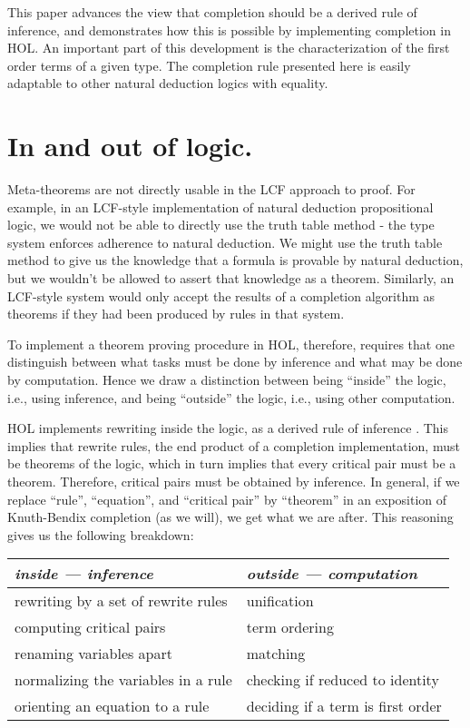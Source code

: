 This paper advances the view that completion should be a derived rule of
inference, and demonstrates how this is possible by implementing completion in
HOL. An important part of this development is the characterization of the first
order terms of a given type. The completion rule presented here is easily
adaptable to other natural deduction logics with equality.

\section{In and out of logic.}

Meta-theorems are not directly usable in the LCF approach to proof. For
example, in an LCF-style implementation of natural deduction propositional
logic, we would not be able to directly use the truth table method - the type
system enforces adherence to natural deduction. We might use the truth table
method to give us the knowledge that a formula is provable by natural
deduction, but we wouldn't be allowed to assert that knowledge as a theorem.
Similarly, an LCF-style system would only accept the results of a completion
algorithm as theorems if they had been produced by rules in that system.

To implement a theorem proving procedure in HOL, therefore, requires that one
distinguish between what tasks must be done by inference and what may be done
by computation. Hence we draw a distinction between being ``inside'' the logic,
i.e., using inference, and being ``outside'' the logic, i.e., using other
computation.

HOL implements rewriting inside the logic, as a derived rule of inference
\cite{paulson83}. This implies that rewrite rules, the end product of a
completion implementation, must be theorems of the logic, which in turn implies
that every critical pair must be a theorem. Therefore, critical pairs must be
obtained by inference. In general, if we replace ``rule'', ``equation'', and
``critical pair'' by ``theorem'' in an exposition of Knuth-Bendix completion
(as we will), we get what we are after. This reasoning gives us the following
breakdown:

\begin{table}[hbt]\centering
\begin{tabular}{| l | l | }  \hline
{\em inside  --- inference} & {\em outside  --- computation} \\  \hline
rewriting by a set of rewrite rules & unification \\ 
computing critical pairs & term ordering \\
renaming variables apart & matching \\
normalizing the variables in a rule & checking if reduced to identity \\
orienting an equation to a rule & deciding if a term is first order \\
\hline \hline
\end{tabular}
\end{table}

